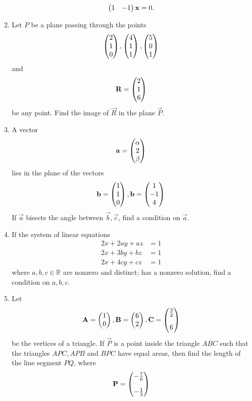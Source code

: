 \documentclass[journal,12pt,twocolumn]{IEEEtran}
\renewcommand\thesection{\arabic{section}}
\begin{document}
\begin{enumerate}[label=\thesection.\arabic*.,ref=\thesection.\theenumi]
\begin{align}
\begin{pmatrix}1 & -1 \end{pmatrix}\mathbf{x}  = 0.
\end{align}
\item Let $P$ be a plane passing through the points 
\begin{align}
	\begin{pmatrix}2 \\  1 \\ 0 \end{pmatrix}, 	\begin{pmatrix}4 \\  1 \\ 1 \end{pmatrix}, 	\begin{pmatrix}5 \\  0 \\ 1 \end{pmatrix}
\end{align}
and 
\begin{align}
	\mathbf{R} = 	\begin{pmatrix}2 \\  1 \\ 6 \end{pmatrix}
\end{align}
		be any point.  Find the image of $\vec{R}$ in the plane $\vec{P}$.
	\item A vector 
\begin{align}
	\mathbf{a} = 	\begin{pmatrix}\alpha \\  2 \\ \beta \end{pmatrix}
\end{align}
lies in the plane of the vectors 
\begin{align}
	\mathbf{b} = 	\begin{pmatrix}1\\  1 \\ 0\end{pmatrix}, 
	\mathbf{b} = 	\begin{pmatrix}1\\  -1 \\ 4\end{pmatrix}
\end{align}
		If $\vec{a}$ bisects the angle between $\vec{b}, \vec{c}$, find a condition on $\vec{a}$.
	\item If the system of linear equations 
\begin{align}
	2x + 2ay + az & = 1
	\\
	2x + 3by + bz & = 1
	\\
	2x + 4cy + cz & = 1
\end{align}
where $a, b, c \in \mathbb{R}$ are nonzero and distinct; has a nonzero solution, find a condition on $a,b,c$.
\item Let 
\begin{align}
	\mathbf{A} = 	\begin{pmatrix}1\\   0\end{pmatrix}, 
	\mathbf{B} = 	\begin{pmatrix}6\\ 2 \end{pmatrix},
	\mathbf{C} = 	\begin{pmatrix}\frac{3}{2}\\[1em] 6\end{pmatrix}
\end{align}
be the vertices of a triangle.  If $\vec{P}$ is a point inside the triangle $ABC$ such that the triangles $APC,APB$ and $BPC$ have equal areas, then find the length of the line segment $PQ$, where  
\begin{align}
	\mathbf{P} = 	\begin{pmatrix}-\frac{7}{6}\\[1em] -\frac{1}{3} \end{pmatrix} 
\end{align}
\end{enumerate}
\end{document}
